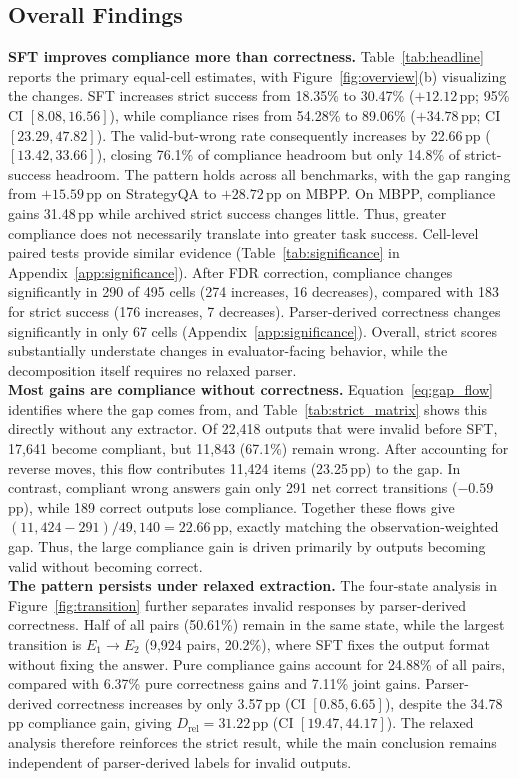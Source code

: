\documentclass{article}
\newcommand{\pp}{\,pp}
\newcommand{\Drel}{D_{\mathrm{rel}}}
\newcommand{\Eone}{E_1}
\newcommand{\Etwo}{E_2}
\begin{document}
\subsection{Overall Findings}
\label{sec:headline}
\vspace{-2mm}
\textbf{SFT improves compliance more than correctness.}
Table~\ref{tab:headline} reports the primary equal-cell estimates, with
Figure~\ref{fig:overview}(b) visualizing the changes. SFT increases strict
success from 18.35\% to 30.47\% ($+12.12$\pp{}; 95\% CI
$[8.08,16.56]$), while compliance rises from 54.28\% to 89.06\%
($+34.78$\pp{}; CI $[23.29,47.82]$). The valid-but-wrong rate consequently
increases by 22.66\pp{} ($[13.42,33.66]$), closing 76.1\% of compliance
headroom but only 14.8\% of strict-success headroom.
The pattern holds across all benchmarks, with the gap ranging from
$+15.59$\pp{} on StrategyQA to $+28.72$\pp{} on MBPP. On MBPP, compliance
gains 31.48\pp{} while archived strict success changes little. Thus, greater
compliance does not necessarily translate into greater task success.
Cell-level paired tests provide similar evidence (Table~\ref{tab:significance}
in Appendix~\ref{app:significance}). After FDR correction, compliance changes
significantly in 290 of 495 cells (274 increases, 16 decreases), compared with
183 for strict success (176 increases, 7 decreases). Parser-derived
correctness changes significantly in only 67 cells
(Appendix~\ref{app:significance}). Overall, strict scores substantially
understate changes in evaluator-facing behavior, while the decomposition itself
requires no relaxed parser.
\\
\noindent\textbf{Most gains are compliance without correctness.}
Equation~\eqref{eq:gap_flow} identifies where the gap comes from, and
Table~\ref{tab:strict_matrix} shows this directly without any extractor.
Of 22{,}418 outputs that were invalid before SFT, 17{,}641 become compliant,
but 11{,}843 (67.1\%) remain wrong. After accounting for reverse moves, this
flow contributes 11{,}424 items (23.25\pp{}) to the gap. In contrast, compliant
wrong answers gain only 291 net correct transitions ($-0.59$\pp{}), while
189 correct outputs lose compliance. Together these flows give
$(11{,}424-291)/49{,}140=22.66$\pp{}, exactly matching the observation-weighted
gap. Thus, the large compliance gain is driven primarily by outputs becoming
valid without becoming correct.
\\
\noindent\textbf{The pattern persists under relaxed extraction.}
The four-state analysis in Figure~\ref{fig:transition} further separates
invalid responses by parser-derived correctness. Half of all pairs (50.61\%)
remain in the same state, while the largest transition is
$\Eone\!\to\!\Etwo$ (9{,}924 pairs, 20.2\%), where SFT fixes the output format
without fixing the answer. Pure compliance gains account for 24.88\% of all
pairs, compared with 6.37\% pure correctness gains and 7.11\% joint gains.
Parser-derived correctness increases by only 3.57\pp{} (CI
$[0.85,6.65]$), despite the 34.78\pp{} compliance gain, giving
$\Drel=31.22$\pp{} (CI $[19.47,44.17]$). The relaxed analysis therefore
reinforces the strict result, while the main conclusion remains independent
of parser-derived labels for invalid outputs.
\end{document}
